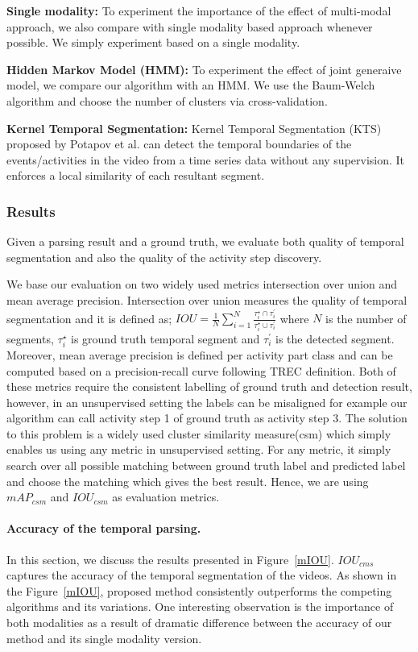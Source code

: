 \noindent\textbf{Single modality:}
To experiment the importance of the effect of multi-modal approach, we also compare with single modality based approach whenever possible. We simply experiment based on a single modality.

\noindent\textbf{Hidden Markov Model (HMM):}
To experiment the effect of joint generaive model, we compare our algorithm with an HMM. We use the Baum-Welch algorithm\cite{rabiner} and choose the number of clusters via cross-validation.


\noindent\textbf{Kernel Temporal Segmentation\cite{potapov2014category}:}
Kernel Temporal Segmentation (KTS) proposed by Potapov et al.\cite{potapov2014category} can detect the temporal boundaries of the events/activities in the video from a time series data without any supervision. It enforces a local similarity of each resultant segment.

\subsubsection{Results}
Given a parsing result and a ground truth, we evaluate both quality of temporal segmentation and also the quality of the activity step discovery. 

We base our evaluation on two widely used metrics intersection over union and mean average precision. Intersection over union measures the quality of temporal segmentation and it is defined as; $IOU=\frac{1}{N}\sum_{i=1}^N \frac{\tau^\star_i \cap \tau^\prime_{i}}{\tau^\star_i \cup \tau^\prime_{i}}$ where $N$ is the number of segments, $\tau^\star_i$ is ground truth temporal segment and $\tau^\prime_{i}$ is the detected segment. Moreover, mean average precision is defined per activity part class and can be computed based on a precision-recall curve following TREC\cite{trecc} definition. Both of these metrics require the consistent labelling of ground truth and detection result, however, in an unsupervised setting the labels can be misaligned for example our algorithm can call activity step 1 of ground truth as activity step 3. The solution to this problem is a widely used cluster similarity measure(csm)\cite{liao05} which simply enables us using any metric in unsupervised setting. For any metric, it simply search over all possible matching between ground truth label and predicted label and choose the matching which gives the best result. Hence, we are using $mAP_{csm}$ and $IOU_{csm}$ as evaluation metrics.


\paragraph{Accuracy of the temporal parsing.}
In this section, we discuss the results presented in Figure~\ref{mIOU}. $IOU_{cms}$ captures the accuracy of the temporal segmentation of the videos. As shown in the Figure~\ref{mIOU}, proposed method consistently outperforms the competing algorithms and its variations. One interesting observation is the importance of both modalities as a result of dramatic difference between the accuracy of our method and its single modality version.

